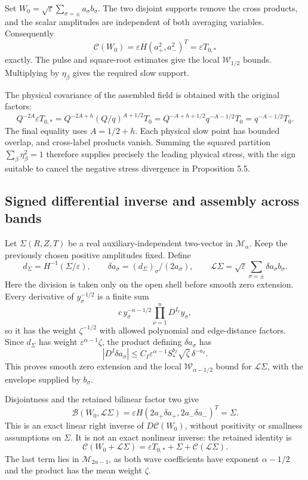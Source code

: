 \documentclass[10pt,a4paper]{article}
\begin{document}
Set \(W_0=\sqrt\varepsilon\sum_{\sigma=\pm}a_\sigma b_\sigma\). The two disjoint supports remove the cross products, and the scalar amplitudes are independent of both averaging variables. Consequently \[
\mathcal C(W_0)=\varepsilon H(a_+^2,a_-^2)^T
=\varepsilon T_{0,*}
\] exactly. The pulse and square-root estimates give the local \(\mathcal W_{1/2}\) bounds. Multiplying by \(\eta_\beta\) gives the required slow support.

The physical covariance of the assembled field is obtained with the original factors: \[
Q^{-2A}\varepsilon T_{0,*}
=Q^{-2A+h}(Q/q)^{A+1/2}T_0
=Q^{-A+h+1/2}q^{-A-1/2}T_0
=q^{-A-1/2}T_0.
\] The final equality uses \(A=1/2+h\). Each physical slow point has bounded overlap, and cross-label products vanish. Summing the squared partition \(\sum_\beta\eta_\beta^2=1\) therefore supplies precisely the leading physical stress, with the sign suitable to cancel the negative stress divergence in Proposition 5.5.

\subsection{Signed differential inverse and assembly across bands}\label{signed-differential-inverse-and-assembly-across-bands}

Let \(\Sigma(R,Z,T)\) be a real auxiliary-independent two-vector in \(\mathcal M_\alpha\). Keep the previously chosen positive amplitudes fixed. Define \[
d_\Sigma=H^{-1}(\Sigma/\varepsilon),\qquad
\delta a_\sigma=(d_\Sigma)_\sigma/(2a_\sigma),\qquad
\mathcal L\Sigma=\sqrt\varepsilon\sum_{\sigma=\pm}\delta a_\sigma b_\sigma.
\] Here the division is taken only on the open shell before smooth zero extension. Every derivative of \(y_\sigma^{-1/2}\) is a finite sum \[
c\,y_\sigma^{-n-1/2}\prod_{\nu=1}^nD^{I_\nu}y_\sigma,
\] so it has the weight \(\zeta^{-1/2}\) with allowed polynomial and edge-distance factors. Since \(d_\Sigma\) has weight \(\varepsilon^{\alpha-1}\zeta\), the product defining \(\delta a_\sigma\) has \[
|D^I\delta a_\sigma|
\le C_I\varepsilon^{\alpha-1}S_*^{b_I}\sqrt\zeta\,\delta^{-a_I}.
\] This proves smooth zero extension and the local \(\mathcal W_{\alpha-1/2}\) bound for \(\mathcal L\Sigma\), with the envelope supplied by \(b_\sigma\).

Disjointness and the retained bilinear factor two give \[
\mathcal B(W_0,\mathcal L\Sigma)
=\varepsilon H(2a_+\delta a_+,2a_-\delta a_-)^T
=\Sigma.
\] This is an exact linear right inverse of \(D\mathcal C(W_0)\), without positivity or smallness assumptions on \(\Sigma\). It is not an exact nonlinear inverse: the retained identity is \[
\mathcal C(W_0+\mathcal L\Sigma)
=\varepsilon T_{0,*}+\Sigma+\mathcal C(\mathcal L\Sigma).
\] The last term lies in \(\mathcal M_{2\alpha-1}\), as both wave coefficients have exponent \(\alpha-1/2\) and the product has the mean weight \(\zeta\).
\end{document}
